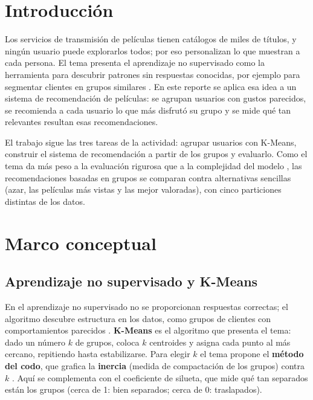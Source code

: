 \documentclass[11pt,letterpaper]{article}
\begin{document}
\portada
\indicegeneral

\section{Introducción}

Los servicios de transmisión de películas tienen catálogos de miles de títulos, y ningún usuario puede explorarlos todos; por eso personalizan lo que muestran a cada persona. El tema presenta el aprendizaje no supervisado como la herramienta para descubrir patrones sin respuestas conocidas, por ejemplo para segmentar clientes en grupos similares \parencite{iae_u4_t43}. En este reporte se aplica esa idea a un sistema de recomendación de películas: se agrupan usuarios con gustos parecidos, se recomienda a cada usuario lo que más disfrutó su grupo y se mide qué tan relevantes resultan esas recomendaciones.

El trabajo sigue las tres tareas de la actividad: agrupar usuarios con K-Means, construir el sistema de recomendación a partir de los grupos y evaluarlo. Como el tema da más peso a la evaluación rigurosa que a la complejidad del modelo \parencite{iae_u4_t43}, las recomendaciones basadas en grupos se comparan contra alternativas sencillas (azar, las películas más vistas y las mejor valoradas), con cinco particiones distintas de los datos.

\section{Marco conceptual}

\subsection{Aprendizaje no supervisado y K-Means}

En el aprendizaje no supervisado no se proporcionan respuestas correctas; el algoritmo descubre estructura en los datos, como grupos de clientes con comportamientos parecidos \parencite{iae_u4_t43}. \textbf{K-Means} es el algoritmo que presenta el tema: dado un número $k$ de grupos, coloca $k$ centroides y asigna cada punto al más cercano, repitiendo hasta estabilizarse. Para elegir $k$ el tema propone el \textbf{método del codo}, que grafica la \textbf{inercia} (medida de compactación de los grupos) contra $k$ \parencite{iae_u4_t43}. Aquí se complementa con el coeficiente de silueta, que mide qué tan separados están los grupos (cerca de 1: bien separados; cerca de 0: traslapados).
\end{document}
